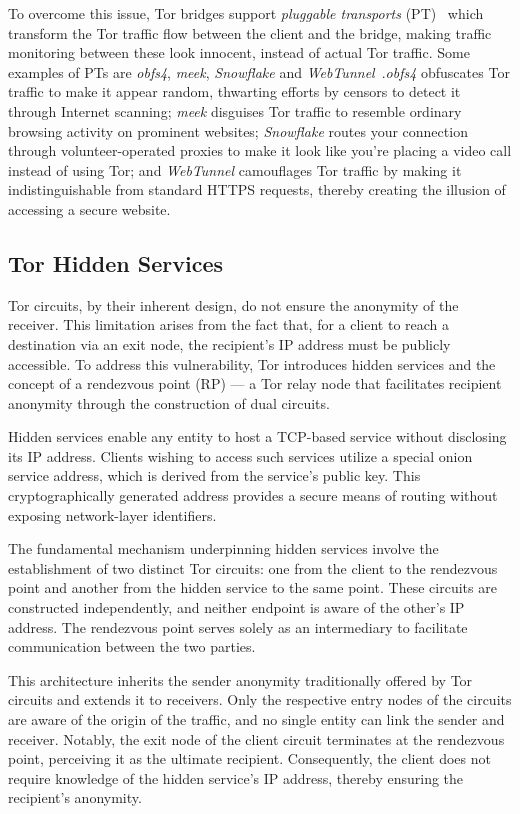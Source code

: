 To overcome this issue, Tor bridges support \textit{pluggable transports} (PT)~\cite{PlugTrans} which transform the Tor traffic flow between the client and the bridge, making traffic monitoring between these look innocent, instead of actual Tor traffic. Some examples of PTs are \textit{obfs4}, \textit{meek}, \textit{Snowflake} and \textit{WebTunnel}~\cite{Circumvention}.\@ \textit{obfs4} obfuscates Tor traffic to make it appear random, thwarting efforts by censors to detect it through Internet scanning; \textit{meek} disguises Tor traffic to resemble ordinary browsing activity on prominent websites; \textit{Snowflake} routes your connection through volunteer-operated proxies to make it look like you're placing a video call instead of using Tor; and \textit{WebTunnel} camouflages Tor traffic by making it indistinguishable from standard HTTPS requests, thereby creating the illusion of accessing a secure website.

\subsection{Tor Hidden Services}\label{subsec:tor_hidden_services}
Tor circuits, by their inherent design, do not ensure the anonymity of the receiver. This limitation arises from the fact that, for a client to reach a destination via an exit node, the recipient's IP address must be publicly accessible. To address this vulnerability, Tor introduces hidden services and the concept of a rendezvous point (RP) — a Tor relay node that facilitates recipient anonymity through the construction of dual circuits.

Hidden services enable any entity to host a TCP-based service without disclosing its IP address. Clients wishing to access such services utilize a special onion service address, which is derived from the service's public key. This cryptographically generated address provides a secure means of routing without exposing network-layer identifiers.

The fundamental mechanism underpinning hidden services involve the establishment of two distinct Tor circuits: one from the client to the rendezvous point and another from the hidden service to the same point. These circuits are constructed independently, and neither endpoint is aware of the other's IP address. The rendezvous point serves solely as an intermediary to facilitate communication between the two parties.

This architecture inherits the sender anonymity traditionally offered by Tor circuits and extends it to receivers. Only the respective entry nodes of the circuits are aware of the origin of the traffic, and no single entity can link the sender and receiver. Notably, the exit node of the client circuit terminates at the rendezvous point, perceiving it as the ultimate recipient. Consequently, the client does not require knowledge of the hidden service's IP address, thereby ensuring the recipient's anonymity.


